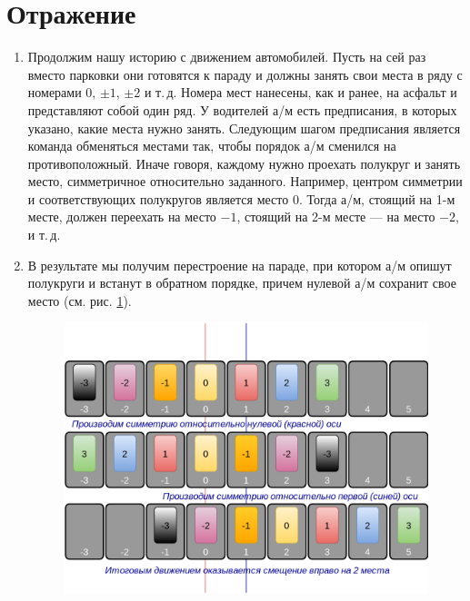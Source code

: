 \section{Отражение}



\begin{enumerate}
\item Продолжим нашу историю с движением автомобилей. Пусть на сей раз вместо парковки они готовятся к параду и должны занять свои места в ряду с номерами 0, $\pm 1$, $\pm 2$ и т.\,д. Номера мест нанесены, как и ранее, на асфальт и представляют собой один ряд. У водителей а/м есть предписания, в которых указано, какие места нужно занять. Следующим шагом предписания является команда обменяться местами так, чтобы порядок а/м сменился на противоположный. Иначе говоря, каждому нужно проехать полукруг и занять место, симметричное относительно заданного. Например, центром симметрии и соответствующих полукругов является место 0. Тогда а/м, стоящий на 1-м месте, должен переехать на место $-1$, стоящий на 2-м месте --- на место $-2$, и т.\,д.
\item В результате мы получим перестроение на параде, при котором а/м опишут полукруги и встанут в обратном порядке, причем нулевой а/м сохранит свое место (см. рис. \ref{SST}).
\begin{figure}[hbt!]
\begin{center}
\includegraphics[scale=0.3]{SST.png}
\end{center}
\caption{}\label{SST}
\end{figure}

\end{enumerate}
